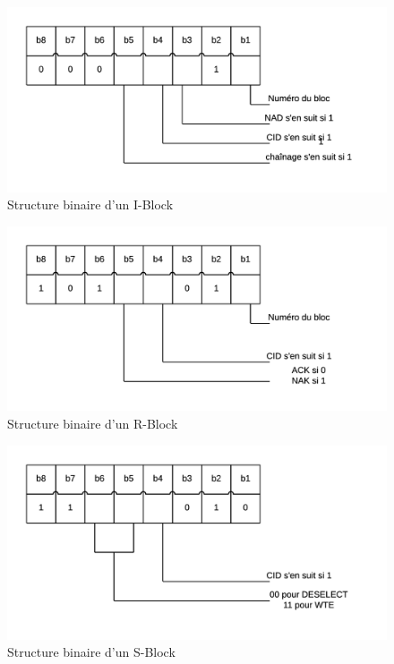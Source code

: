 \documentclass{themeensg}
\begin{document}
\begin{figure}[h!]
\centering
\includegraphics[scale=1]{images/iblock.png}
\caption{Structure binaire d'un I-Block}
\label{fig:I-Block}
\end{figure}

\begin{figure}[h!]
\centering
\includegraphics[scale=1]{images/rblock.png}
\caption{Structure binaire d'un R-Block}
\label{fig:R-Block}
\end{figure}

\begin{figure}[h!]
\centering
\includegraphics[scale=1]{images/sblock.png}
\caption{Structure binaire d'un S-Block}
\label{fig:S-Block}
\end{figure}
\end{document}
